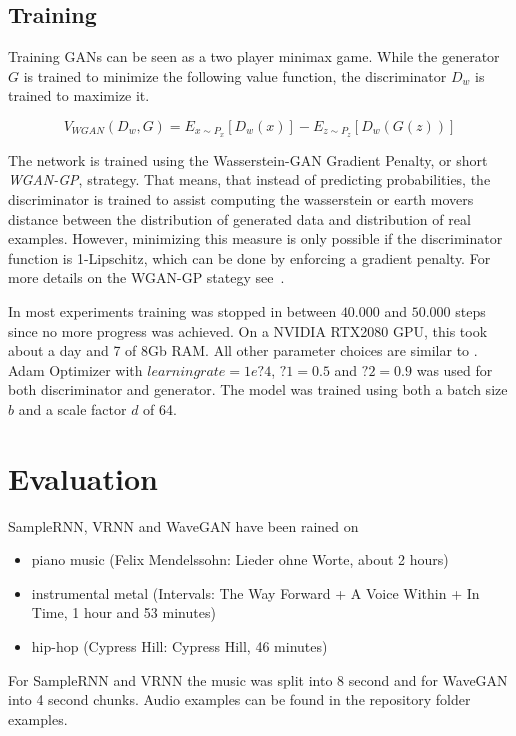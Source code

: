 \documentclass[12pt]{article}
\begin{document}
\subsection{Training}

Training GANs can be seen as a two player minimax game. 
While the generator $G$ is trained to minimize the following value function, the discriminator
$D_w$ is trained to maximize it.

$$
V_{WGAN}(D_w, G) = E_{x \sim P_x}[D_w(x)] - E_{z \sim P_z}[D_w(G(z))]
$$

The network is trained using the Wasserstein-GAN Gradient Penalty, or short \emph{WGAN-GP}, strategy.
That means, that instead of predicting probabilities, the discriminator is trained to assist computing the wasserstein or
earth movers distance between the distribution of generated data and distribution of real examples.
However, minimizing this measure is only possible if the discriminator function is 1-Lipschitz, which can be done by enforcing a gradient penalty.
For more details on the WGAN-GP stategy see~\cite{gulrajani2017improved}.

In most experiments training was stopped in between $40.000$ and $50.000$ steps since no more progress was achieved.
On a NVIDIA RTX2080 GPU, this took about a day and 7 of 8Gb RAM.
All other parameter choices are similar to \cite{donahue2018adversarial}.
Adam Optimizer with $learning rate = 1e ? 4$, $?1 = 0.5$ and $?2 = 0.9$
was used for both discriminator and generator.
The model was trained using both a batch size $b$ and a scale factor $d$ of 64.


\section{Evaluation}
SampleRNN, VRNN and WaveGAN have been rained on
\begin{itemize}
 \item piano music (Felix Mendelssohn: Lieder ohne Worte, about 2 hours)
 \item instrumental metal (Intervals: The Way Forward + A Voice Within + In Time, 1 hour and 53 minutes) %
 \item hip-hop (Cypress Hill: Cypress Hill, 46 minutes)
\end{itemize}

For SampleRNN and VRNN the music was split into 8 second and for WaveGAN into 4 second chunks.
Audio examples can be found in the repository folder examples. %
\end{document}
